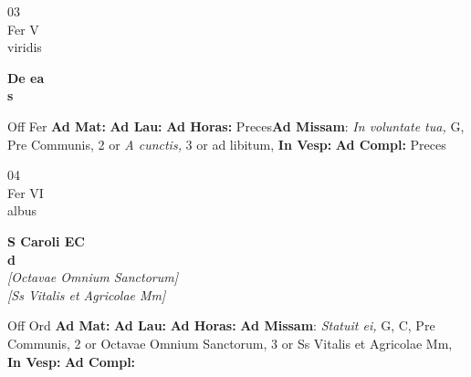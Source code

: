 \documentclass[10pt, openany]{book}
\begin{document}
        \begin{center}
            \begin{minipage}{3.5in}
                \vspace{2em}
                \begin{minipage}{0.5in}
                    {\Huge 03} \\
                    {\normalsize Fer V} \\
                    {\normalsize viridis}
                \end{minipage}
                \begin{minipage}{3.0in}
                    \textbf{ \large De ea \\
                    \textnormal{\normalsize s}} \\ 
                \end{minipage}
                \begin{justify}Off Fer
                    \textbf{Ad Mat: }
                    \textbf{Ad Lau: }
                    \textbf{Ad Horas: }Preces\textbf{Ad Missam}: \textit{In voluntate tua,} G, Pre Communis, 2 or \textit{A cunctis,} 3 or ad libitum,  
                    \textbf{In Vesp: }
                    \textbf{Ad Compl: }Preces
                \end{justify}
            \end{minipage}
        \end{center}
    
        \begin{center}
            \begin{minipage}{3.5in}
                \vspace{2em}
                \begin{minipage}{0.5in}
                    {\Huge 04} \\
                    {\normalsize Fer VI} \\
                    {\normalsize albus}
                \end{minipage}
                \begin{minipage}{3.0in}
                    \textbf{ \large S Caroli EC \\
                    \textnormal{\normalsize d}} \\ \textit{[Octavae Omnium Sanctorum]} \\ \textit{[Ss Vitalis et Agricolae Mm]} \\ 
                \end{minipage}
                \begin{justify}Off Ord
                    \textbf{Ad Mat: }
                    \textbf{Ad Lau: }
                    \textbf{Ad Horas: }\textbf{Ad Missam}: \textit{Statuit ei,} G, C, Pre Communis, 2 or Octavae Omnium Sanctorum, 3 or Ss Vitalis et Agricolae Mm,  
                    \textbf{In Vesp: }
                    \textbf{Ad Compl: }
                \end{justify}
            \end{minipage}
        \end{center}
    
\end{document}
